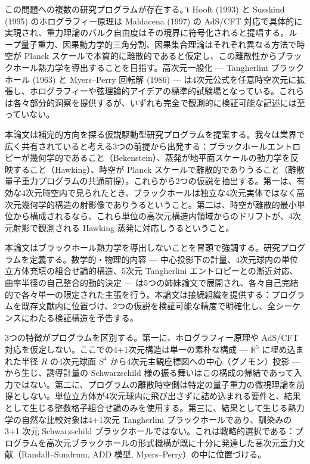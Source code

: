 \documentclass[a4paper,11pt]{ltjsarticle}
\theoremstyle{definition}
\begin{document}
この問題への複数の研究プログラムが存在する。't Hooft (1993) と Susskind
(1995) のホログラフィー原理は Maldacena (1997) の AdS/CFT
対応で具体的に実現され、重力理論のバルク自由度はその境界に符号化されると提唱する。ループ量子重力、因果動力学的三角分割、因果集合理論はそれぞれ異なる方法で時空が
Planck
スケールで本質的に離散的であると仮定し、この離散性からブラックホール熱力学を導出することを目指す。高次元一般化
--- Tangherlini ブラックホール (1963) と Myers--Perry 回転解 (1986) ---
は4次元公式を任意時空次元に拡張し、ホログラフィーや弦理論的アイデアの標準的試験場となっている。これらは各々部分的洞察を提供するが、いずれも完全で観測的に検証可能な記述には至っていない。

本論文は補完的方向を探る仮説駆動型研究プログラムを提案する。我々は業界で広く共有されていると考える3つの前提から出発する：ブラックホールエントロピーが幾何学的であること（Bekenstein）、蒸発が地平面スケールの動力学を反映すること（Hawking）、時空が
Planck
スケールで離散的でありうること（離散量子重力プログラムの共通前提）。これらから2つの仮説を抽出する。第一は、有効な4次元時空内で見られたとき、ブラックホールは独立な4次元実体ではなく高次元幾何学的構造の射影像でありうるということ。第二は、時空が離散的最小単位から構成されるなら、これら単位の高次元構造内領域からのドリフトが、4次元射影で観測される
Hawking 蒸発に対応しうるということ。

本論文はブラックホール熱力学を導出しないことを冒頭で強調する。研究プログラムを定義する。数学的・物理的内容
--- 中心投影下の計量、4次元球内の単位立方体充填の組合せ論的構造、5次元
Tangherlini エントロピーとの漸近対応、曲率半径の自己整合的動的決定 ---
は5つの姉妹論文で展開され、各々自己完結的で各々単一の限定された主張を行う。本論文は接続組織を提供する：プログラムを既存文献内に位置づけ、2つの仮説を検証可能な精度で明確化し、全シーケンスにわたる検証構造を予告する。

3つの特徴がプログラムを区別する。第一に、ホログラフィー原理や AdS/CFT
対応を仮定しない。ここでの4+1次元構造は単一の素朴な構成 ---
\(\mathbb{R}^5\) に埋め込まれた半径 \(R\) の4次元球面 \(S^4\)
から4次元主観座標図への中心（グノモン）投影 --- から生じ、誘導計量の
Schwarzschild
様の振る舞いはこの構成の帰結であって入力ではない。第二に、プログラムの離散時空側は特定の量子重力の微視理論を前提としない。単位立方体が4次元球内に飛び出さずに詰め込まれる要件と、結果として生じる整数格子組合せ論のみを使用する。第三に、結果として生じる熱力学の自然な比較対象は4+1次元
Tangherlini ブラックホールであり、馴染みの 3+1 次元 Schwarzschild
ブラックホールではない。これは戦略的選択である：プログラムを高次元ブラックホールの形式機構が既に十分に発達した高次元重力文献（Randall--Sundrum,
ADD 模型, Myers--Perry）の中に位置づける。
\end{document}
